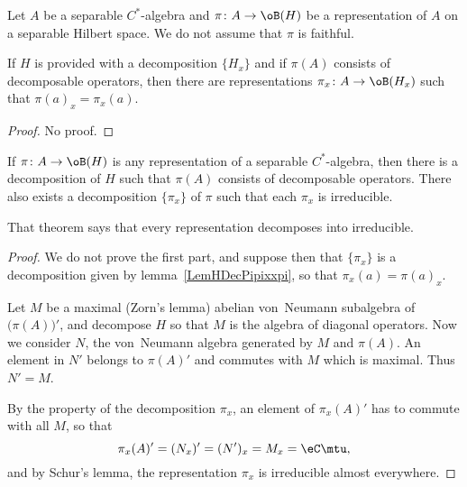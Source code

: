 Let $A$ be a separable $C^*$-algebra and $\pi\colon A\to \oB(H)$ be a representation of $A$ on a separable Hilbert space. We do not assume that $\pi$ is faithful.

\begin{lemma}		\label{LemHDecPipixxpi}
If $H$ is provided with a decomposition $\{ H_x \}$ and if $\pi(A)$ consists of decomposable operators, then there are representations $\pi_x\colon A\to \oB(H_x)$ such that $\pi(a)_x=\pi_x(a)$.
\end{lemma}

\begin{proof}
No proof.
\end{proof}

\begin{theorem}		\label{ThoRepDecSepIrrep}
	If $\pi\colon A\to \oB(H)$ is any representation of a separable $C^*$-algebra, then there is a decomposition of $H$ such that $\pi(A)$ consists of decomposable operators. There also exists a decomposition $\{ \pi_x \}$ of $\pi$ such that each $\pi_x$ is irreducible.
\end{theorem}

That theorem says that every representation decomposes into irreducible.

\begin{proof}

	We do not prove the first part, and suppose then that $\{ \pi_x \}$ is a decomposition given by lemma~\ref{LemHDecPipixxpi}, so that $\pi_x(a)=\pi(a)_x$.

	Let $M$ be a maximal (Zorn's lemma) abelian von~Neumann subalgebra of $\big( \pi(A) \big)'$, and decompose $H$ so that $M$ is the algebra of diagonal operators. Now we consider $N$, the von~Neumann algebra generated by $M$ and $\pi(A)$. An element in $N'$ belongs to $\pi(A)'$ and commutes with $M$ which is maximal. Thus $N'=M$.

	By the property of the decomposition $\pi_x$, an element of $\pi_x(A)'$ has to commute with all $M$, so that
	\begin{equation}
		\pi_x(A)'=(N_x)'=(N')_x=M_x=\eC\mtu,
	\end{equation}
	and by Schur's lemma, the representation $\pi_x$ is irreducible almost everywhere.
\end{proof}

